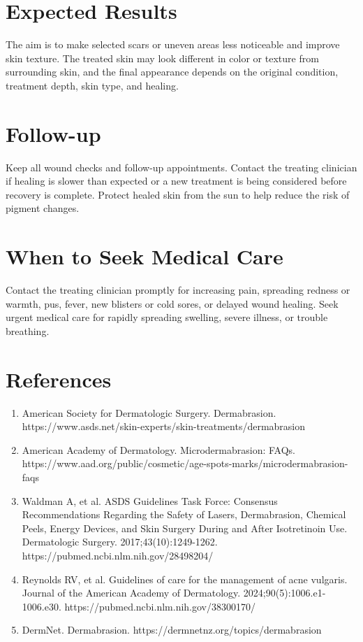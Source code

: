 \section*{Expected Results}
The aim is to make selected scars or uneven areas less noticeable and improve skin texture. The treated skin may look different in color or texture from surrounding skin, and the final appearance depends on the original condition, treatment depth, skin type, and healing.

\section*{Follow-up}
Keep all wound checks and follow-up appointments. Contact the treating clinician if healing is slower than expected or a new treatment is being considered before recovery is complete. Protect healed skin from the sun to help reduce the risk of pigment changes.

\section*{When to Seek Medical Care}
Contact the treating clinician promptly for increasing pain, spreading redness or warmth, pus, fever, new blisters or cold sores, or delayed wound healing. Seek urgent medical care for rapidly spreading swelling, severe illness, or trouble breathing.

\section*{References}
\begin{enumerate}
  \item American Society for Dermatologic Surgery. Dermabrasion. https://www.asds.net/skin-experts/skin-treatments/dermabrasion
  \item American Academy of Dermatology. Microdermabrasion: FAQs. https://www.aad.org/public/cosmetic/age-spots-marks/microdermabrasion-faqs
  \item Waldman A, et al. ASDS Guidelines Task Force: Consensus Recommendations Regarding the Safety of Lasers, Dermabrasion, Chemical Peels, Energy Devices, and Skin Surgery During and After Isotretinoin Use. Dermatologic Surgery. 2017;43(10):1249-1262. https://pubmed.ncbi.nlm.nih.gov/28498204/
  \item Reynolds RV, et al. Guidelines of care for the management of acne vulgaris. Journal of the American Academy of Dermatology. 2024;90(5):1006.e1-1006.e30. https://pubmed.ncbi.nlm.nih.gov/38300170/
  \item DermNet. Dermabrasion. https://dermnetnz.org/topics/dermabrasion
\end{enumerate}

\clearpage
